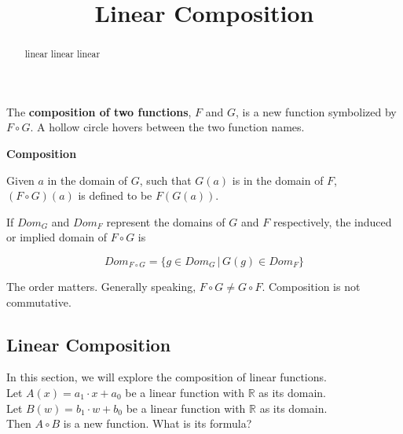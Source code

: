 \documentclass{ximera}
\title{Linear Composition}
\begin{document}
\begin{abstract}
linear linear linear
\end{abstract}
\maketitle


The \textbf{\textcolor{purple!85!blue}{composition of two functions}}, $F$ and $G$, is a new function symbolized by $F \circ G$. A hollow circle hovers between the two function names.


\begin{idea} \textbf{\textcolor{blue!55!black}{Composition}} 


Given $a$ in the domain of $G$, such that $G(a)$ is in the domain of $F$, $(F \circ G)(a)$ is defined to be  $F(G(a))$.


If $Dom_G$ and $Dom_F$ represent the domains of $G$ and $F$ respectively, the induced or implied domain of $F \circ G$ is 




\[  Dom_{F \circ G} = \{  g \in  Dom_G  \,   |   \,   G(g) \in Dom_F                 \}           \]

\end{idea}

The order matters.  Generally speaking, $F \circ G \ne G \circ F$. Composition is not commutative.


















\subsection*{Linear Composition}

In this section, we will explore the composition of linear functions. \\


Let $A(x) = a_1 \cdot x + a_0$ be a linear function with $\mathbb{R}$ as its domain. \\
Let $B(w) = b_1 \cdot w + b_0$ be a linear function with $\mathbb{R}$ as its domain. \\


Then $A \circ B$ is a new function. What is its formula? \\
\end{document}
